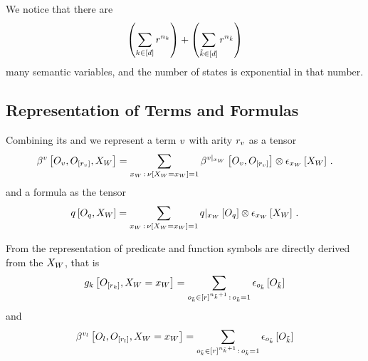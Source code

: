We notice that there are
\begin{align*}
    \left(\sum_{k\in[d]}r^{n_{k}}\right) +  \left(\sum_{\tilde{k}\in[d]}r^{n_{\tilde{k}}}\right)
\end{align*}
many semantic variables, and the number of states is exponential in that number.


\subsection{Representation of Terms and Formulas}

Combining its \substitutionStructure{} and \semanticStructure{} we represent a \firstOrderLogic{} term $v$ with arity $r_{v}$ as a tensor
\begin{align*}
    \bencodingofat{\folterm}{\indvariableof{\folterm},\indvariableof{[\inddimof{\folterm}]},\worldvariables} =
    \sum_{\worldindices\wcols\basemeasureat{\indexedworldvariables}=1}
    \bencodingofat{\groundingof{\folterm}}{\indvariableof{\folterm},\indvariableof{[\inddimof{\folterm}]}}
    \otimes \onehotmapofat{\worldindices}{\worldvariables} \, .
\end{align*}
and a formula as the tensor
\begin{align*}
    q\left[O_{q},X_{W}\right] =
    \sum_{x_{W}\,:\,\nu\left[X_{W}=x_{W}\right]=1} {q}|_{x_{W}} \left[O_{q}\right]
    \otimes \epsilon_{x_{W}}\left[X_{W}\right] \, .
\end{align*}

From  the representation of predicate and function symbols are directly derived from the $X_{W}$, that is
\begin{align*}
    g_{k}\left[O_{[r_{k}]},X_{W}=x_{W}\right]
    = \sum_{o_{\tilde{k}}\in[r]^{n_{\tilde{k}}+1}\,:\,o_{\tilde{k}}=1}
    \epsilon_{o_{\tilde{k}}}\left[O_{\tilde{k}}\right]
\end{align*}
and
\begin{align*}
    \bencodingofat{\folfunctionof{\secatomenumerator}}{\indvariableof{\secatomenumerator},\indvariableof{[\inddimof{\secatomenumerator}]},\indexedworldvariables}
    = \sum_{\indindexof{\seccatenumerator}\in[\inddim]^{\indorderof{\seccatenumerator}+1}\wcols\indindexof{\seccatenumerator}=1} \onehotmapofat{\indindexof{\seccatenumerator}}{\indvariableof{\seccatenumerator}}
\end{align*}

